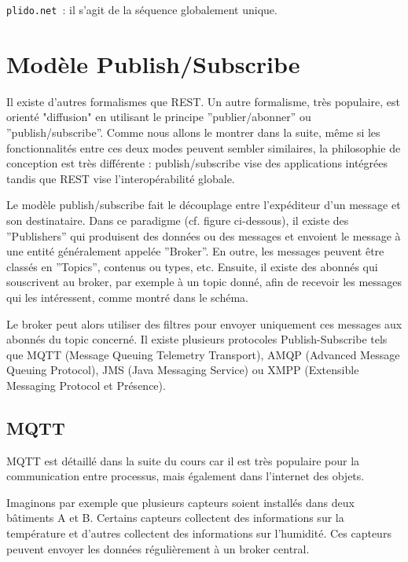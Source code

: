{\noindent\texttt{plido.net}~: il s'agit de la séquence globalement unique.}


\section {Modèle Publish/Subscribe}

Il existe d’autres formalismes que REST. Un autre formalisme, très populaire, est orienté "diffusion" en utilisant le principe ”publier/abonner” ou ”publish/subscribe”. Comme nous allons le montrer dans la suite, même si les fonctionnalités entre ces deux modes peuvent sembler similaires, la philosophie de conception est très différente : publish/subscribe vise des applications intégrées tandis que REST vise l’interopérabilité globale. 

Le modèle publish/subscribe fait le découplage entre l’expéditeur d’un message et son destinataire. Dans ce paradigme (cf. figure ci-dessous), il existe des ”Publishers” qui produisent des données ou des messages et envoient le message à une entité généralement appelée ”Broker”. En outre, les messages peuvent être classés en ”Topics”, contenus ou types, etc. Ensuite, il existe des abonnés qui souscrivent au broker, par exemple à un topic donné, afin de recevoir les messages qui les intéressent, comme montré dans le schéma.

Le broker peut alors utiliser des filtres pour envoyer uniquement ces messages aux abonnés du topic concerné. Il existe plusieurs protocoles Publish-Subscribe tels que MQTT (Message Queuing Telemetry Transport), AMQP (Advanced Message Queuing Protocol), JMS (Java Messaging Service) ou XMPP (Extensible Messaging Protocol et Présence).

\subsection{MQTT}

MQTT est détaillé dans la suite du cours car il est très populaire pour la communication entre processus, mais également dans l’internet des objets.

Imaginons par exemple que plusieurs capteurs soient installés dans deux bâtiments A et B. Certains capteurs collectent des informations sur la température et d’autres collectent des informations sur l’humidité. Ces capteurs peuvent envoyer les données régulièrement à un broker central.


